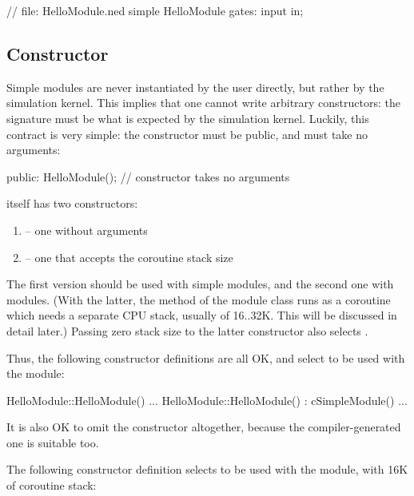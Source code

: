 \begin{ned}
// file: HelloModule.ned
simple HelloModule
{
    gates:
        input in;
}
\end{ned}


\subsection{Constructor}
\label{sec:simple-modules:module-ctor}

Simple modules are never instantiated by the user directly, but rather by
the simulation kernel. This implies that one cannot write arbitrary
constructors: the signature must be what is expected by the simulation kernel.
Luckily, this contract is very simple: the constructor must be public, and must take
no arguments:

\begin{cpp}
  public:
    HelloModule();  // constructor takes no arguments
\end{cpp}

 itself has two constructors:
\begin{enumerate}
  \item {} -- one without arguments
  \item {} -- one that accepts the coroutine
        stack size
\end{enumerate}

The first version should be used with  simple modules,
and the second one with  modules.
(With the latter, the  method of the module class
runs as a coroutine which needs a separate CPU stack,
usually of 16..32K. This will be discussed in detail later.)
Passing zero stack size to the latter constructor also selects .

Thus, the following constructor definitions are all OK, and select
 to be used with the module:

\begin{cpp}
HelloModule::HelloModule() {...}
HelloModule::HelloModule() : cSimpleModule() {...}
\end{cpp}

It is also OK to omit the constructor altogether, because the
compiler-generated one is suitable too.

The following constructor definition selects  to be used
with the module, with 16K of coroutine stack:

